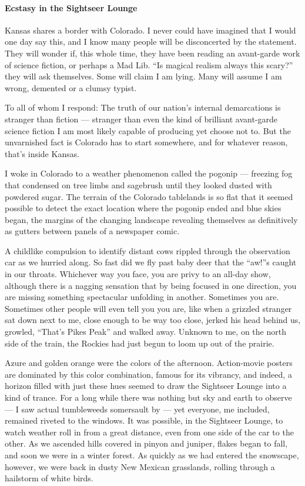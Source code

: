 \hypertarget{ecstasy-in-the-sightseer-lounge}{%
\paragraph{\texorpdfstring{\textbf{Ecstasy in the Sightseer
Lounge}}{Ecstasy in the Sightseer Lounge}}\label{ecstasy-in-the-sightseer-lounge}}

Kansas shares a border with Colorado. I never could have imagined that I
would one day say this, and I know many people will be disconcerted by
the statement. They will wonder if, this whole time, they have been
reading an avant-garde work of science fiction, or perhaps a Mad Lib.
``Is magical realism always this scary?'' they will ask themselves. Some
will claim I am lying. Many will assume I am wrong, demented or a clumsy
typist.

To all of whom I respond: The truth of our nation's internal
demarcations is stranger than fiction --- stranger than even the kind of
brilliant avant-garde science fiction I am most likely capable of
producing yet choose not to. But the unvarnished fact is Colorado has to
start somewhere, and for whatever reason, that's inside Kansas.

I woke in Colorado to a weather phenomenon called the pogonip ---
freezing fog that condensed on tree limbs and sagebrush until they
looked dusted with powdered sugar. The terrain of the Colorado
tablelands is so flat that it seemed possible to detect the exact
location where the pogonip ended and blue skies began, the margins of
the changing landscape revealing themselves as definitively as gutters
between panels of a newspaper comic.

A childlike compulsion to identify distant cows rippled through the
observation car as we hurried along. So fast did we fly past baby deer
that the ``aw!''s caught in our throats. Whichever way you face, you are
privy to an all-day show, although there is a nagging sensation that by
being focused in one direction, you are missing something spectacular
unfolding in another. Sometimes you are. Sometimes other people will
even tell you you are, like when a grizzled stranger sat down next to
me, close enough to be way too close, jerked his head behind us,
growled, ``That's Pikes Peak'' and walked away. Unknown to me, on the
north side of the train, the Rockies had just begun to loom up out of
the prairie.

Azure and golden orange were the colors of the afternoon. Action-movie
posters are dominated by this color combination, famous for its
vibrancy, and indeed, a horizon filled with just these hues seemed to
draw the Sightseer Lounge into a kind of trance. For a long while there
was nothing but sky and earth to observe --- I saw actual tumbleweeds
somersault by --- yet everyone, me included, remained riveted to the
windows. It was possible, in the Sightseer Lounge, to watch weather roll
in from a great distance, even from one side of the car to the other. As
we ascended hills covered in pinyon and juniper, flakes began to fall,
and soon we were in a winter forest. As quickly as we had entered the
snowscape, however, we were back in dusty New Mexican grasslands,
rolling through a hailstorm of white birds.

